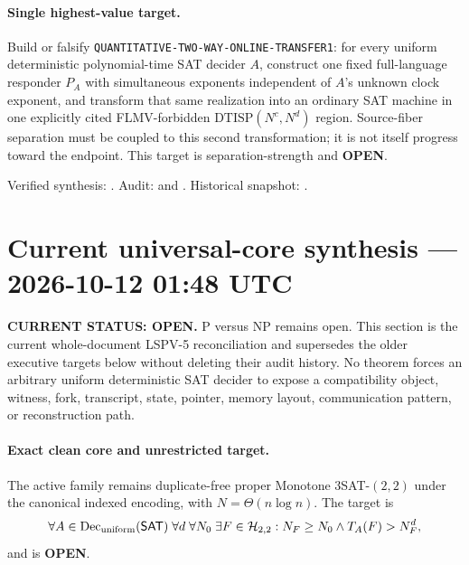 \documentclass[11pt]{article}
\newcommand{\statusopen}{\textcolor{openstatus}{\textbf{OPEN}}}
\begin{document}
\paragraph{Single highest-value target.}
Build or falsify \texttt{QUANTITATIVE-TWO-WAY-ONLINE-TRANSFER1}: for every
uniform deterministic polynomial-time SAT decider $A$, construct one fixed
full-language responder $P_A$ with simultaneous exponents independent of
$A$'s unknown clock exponent, and transform that same realization into an
ordinary SAT machine in one explicitly cited FLMV-forbidden
$\mathrm{DTISP}(N^c,N^d)$ region.  Source-fiber separation must be coupled to
this second transformation; it is not itself progress toward the endpoint.
This target is separation-strength and \statusopen.

Verified synthesis:
.
Audit:
 and
.
Historical snapshot:
.

\clearpage


\section{Current universal-core synthesis --- 2026-10-12 01:48 UTC}

\begin{statusbox}
\textbf{CURRENT STATUS: OPEN.} P versus NP remains open. This section is the
current whole-document LSPV-5 reconciliation and supersedes the older
executive targets below without deleting their audit history. No theorem
forces an arbitrary uniform deterministic SAT decider to expose a
compatibility object, witness, fork, transcript, state, pointer, memory
layout, communication pattern, or reconstruction path.
\end{statusbox}

\paragraph{Exact clean core and unrestricted target.}
The active family remains duplicate-free proper Monotone $3$SAT-$(2,2)$ under
the canonical indexed encoding, with $N=\Theta(n\log n)$. The target is
\[
 \forall A\in\operatorname{Dec}_{\rm uniform}(\mathsf{SAT})\;
 \forall d\;\forall N_0\;\exists F\in\mathcal H_{2,2}:
 N_F\ge N_0\land T_A(F)>N_F^d,
\]
and is \statusopen.
\end{document}
